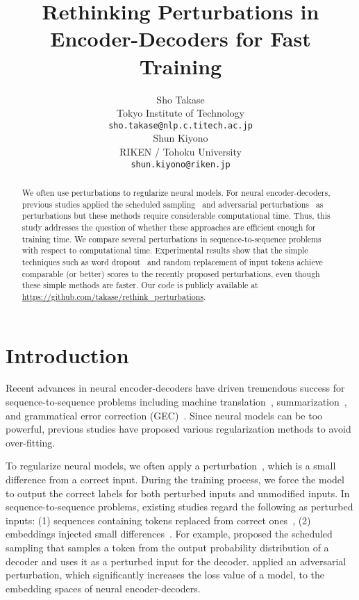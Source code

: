 \documentclass[11pt]{article}
\title{Rethinking Perturbations in Encoder-Decoders for Fast Training}
\author{Sho Takase \\
  Tokyo Institute of Technology \\
  \texttt{sho.takase@nlp.c.titech.ac.jp} \\\And
  Shun Kiyono \\
  RIKEN / Tohoku University \\
  \texttt{shun.kiyono@riken.jp} \\
 }
\begin{document}
\maketitle
\begin{abstract}
We often use perturbations to regularize neural models.
For neural encoder-decoders, previous studies applied the scheduled sampling~\cite{NIPS2015_5956} and adversarial perturbations~\cite{sato-etal-2019-effective} as perturbations but these methods require considerable computational time.
Thus, this study addresses the question of whether these approaches are efficient enough for training time.
We compare several perturbations in sequence-to-sequence problems with respect to computational time.
Experimental results show that the simple techniques such as word dropout~\cite{NIPS2016_6241} and random replacement of input tokens achieve comparable (or better) scores to the recently proposed perturbations, even though these simple methods are faster.
Our code is publicly available at \href{https://github.com/takase/rethink_perturbations}{https://github.com/takase/rethink\_perturbations}.
\end{abstract}

\section{Introduction}
Recent advances in neural encoder-decoders have driven tremendous success for sequence-to-sequence problems including machine translation~\cite{Sutskever:2014:SSL:2969033.2969173}, summarization~\cite{rush-chopra-weston:2015:EMNLP}, and grammatical error correction (GEC)~\cite{ji-etal-2017-nested}.
Since neural models can be too powerful, previous studies have proposed various regularization methods to avoid over-fitting.


To regularize neural models, we often apply a perturbation~\cite{Goodfellow2015,Miyato2017}, which is a small difference from a correct input.
During the training process, we force the model to output the correct labels for both perturbed inputs and unmodified inputs.
In sequence-to-sequence problems, existing studies regard the following as perturbed inputs: (1) sequences containing tokens replaced from correct ones~\cite{NIPS2015_5956,cheng-etal-2019-robust}, (2) embeddings injected small differences~\cite{sato-etal-2019-effective}.
For example,  proposed the scheduled sampling that samples a token from the output probability distribution of a decoder and uses it as a perturbed input for the decoder.
 applied an adversarial perturbation, which significantly increases the loss value of a model, to the embedding spaces of neural encoder-decoders.
\end{document}
